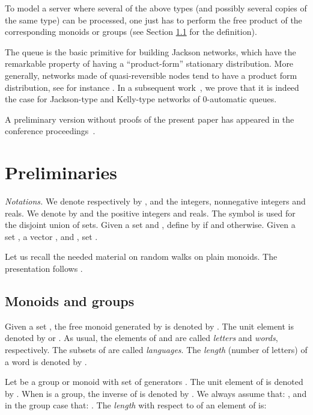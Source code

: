\documentclass[11pt,a4paper]{article}
\theoremstyle{remark}
\begin{document}
\medskip

To model a server where several of the above types (and possibly
several copies of the same type) can be processed, one just has to
perform the free product of the corresponding monoids or groups (see
Section \ref{sse-mg} for the definition). 

\medskip



The  queue is the basic primitive for building Jackson
networks, which have the remarkable property of having a
``product-form'' stationary distribution. More generally, networks
made of quasi-reversible nodes tend to have a product form
distribution, see for instance \cite{serf99}. In a subsequent
work~\cite{DaMa06}, we prove that it is indeed the case for Jackson-type
and Kelly-type
networks of 0-automatic queues.

\medskip

A preliminary version without proofs of the present paper has appeared
in the conference proceedings~\cite{DaMa05}. 

\section{Preliminaries}\label{se-prel}

{\em Notations.} We denote respectively by ,  and  the
integers, nonnegative integers and reals. We 
denote by  and  the positive integers and reals.
The symbol  is used for the disjoint union of sets.
Given a set  and , define   by  if  and  otherwise.
Given a set , a
vector , and , set
.

\medskip

Let us recall the needed material on random walks on plain monoids. 
The presentation follows \cite{mair04,MaMa}.

\subsection{Monoids and groups}\label{sse-mg}

Given a set , the free monoid generated by  is
denoted by . The unit element is denoted by  or . As
usual, the elements of  and  are called {\em
letters} and {\em words}, respectively. The subsets of
 are called {\em languages}. The {\em length} (number
of letters) of a word  is denoted by .

Let  be a group or monoid with set of generators
. The unit element of  is denoted  by . When 
is a group, the inverse of  is denoted by . We
always assume that: , and in the group case
that: . The {\em length}
with respect to  of an element  of  is:
\end{document}
